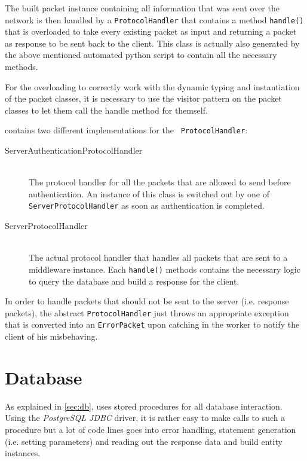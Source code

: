 \documentclass[a4paper, oneside]{csthesis}
\begin{document}
    The built packet instance containing all information that was sent over
    the network is then handled by a {\tt ProtocolHandler} that contains a
    method {\tt handle()} that is overloaded to take every existing packet as
    input and returning a packet as response to be sent back to the client. This
    class is actually also generated by the above mentioned automated python
    script to contain all the necessary methods.
    
    For the overloading to correctly work with the dynamic typing and
    instantiation of the packet classes, it is necessary to use the visitor
    pattern on the packet classes to let them call the handle method for
    themself.
    
    \telesto contains two different implementations for the {\tt
    ProtocolHandler}:
    \begin{description}
    \item[ServerAuthenticationProtocolHandler] \ \\
        The protocol handler for all the packets that are allowed to send before
        authentication. An instance of this class is switched out by one of
        {\tt ServerProtocolHandler} as soon as authentication is completed.
    \item[ServerProtocolHandler] \ \\
        The actual protocol handler that handles all packets that are sent to a
        middleware instance. Each {\tt handle()} methods contains the necessary
        logic to query the database and build a response for the client.
    \end{description} 

    In order to handle packets that should not be sent to the server (i.e.
    response packets), the abstract {\tt ProtocolHandler} just throws an
    appropriate exception that is converted into an {\tt ErrorPacket} upon
    catching in the worker to notify the client of his misbehaving.

\section{Database}
    As explained in \cref{sec:db}, \telesto{} uses stored procedures for all
    database interaction. Using the {\it PostgreSQL JDBC} driver, it is rather
    easy to make calls to such a procedure but a lot of code lines goes into
    error handling, statement generation (i.e. setting parameters) and reading
    out the response data and build entity instances.
    
\end{document}

